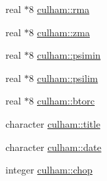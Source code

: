 \begin{CompactItemize}
\item 
real $\ast$8 \hyperlink{namespaceculham_262f15ecbe6c9fb9d128a5d1e1f7ab8b}{culham::rma}
\item 
real $\ast$8 \hyperlink{namespaceculham_7be4069ba1270e1795cc36ebd2dc0a70}{culham::zma}
\item 
real $\ast$8 \hyperlink{namespaceculham_d928d97ed9e2567e915c0c261b8a331e}{culham::psimin}
\item 
real $\ast$8 \hyperlink{namespaceculham_5aa2b255c3d1667ed12833d5f1d466a7}{culham::psilim}
\item 
real $\ast$8 \hyperlink{namespaceculham_d9d2dc032faaf706475d267fde4cbd90}{culham::btorc}
\item 
character \hyperlink{namespaceculham_16e7734b25610633d7174a8355319804}{culham::title}
\item 
character \hyperlink{namespaceculham_851b9b19eaa7d3a62c22962b9f86597d}{culham::date}
\item 
integer \hyperlink{namespaceculham_cf77cb461114f1c1ef92e565a814b1ae}{culham::chop}
\end{CompactItemize}
